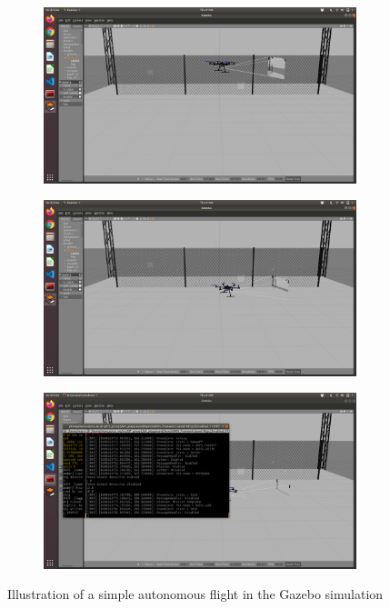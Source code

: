 \documentclass[../Head/Main.tex]{subfiles}
\begin{document}
\begin{figure}[h]
\begin{subfigure}{\figSize}
        \end{subfigure}
        \begin{subfigure}{\figSize}
            \centering
            \includegraphics[width=\textwidth]{../Figures/simulation/Simulation_09.png}
        \end{subfigure}
        \begin{subfigure}{\figSize}
            \centering
            \includegraphics[width=\textwidth]{../Figures/simulation/Simulation_10.png}
        \end{subfigure}
        \begin{subfigure}{\figSize}
            \centering
            \includegraphics[width=\textwidth]{../Figures/simulation/Simulation_11.png}
        \end{subfigure}  
        \caption{Illustration of a simple autonomous flight in the Gazebo simulation}
        \label{fig:SIM_flight}
\end{figure}
\end{document}
